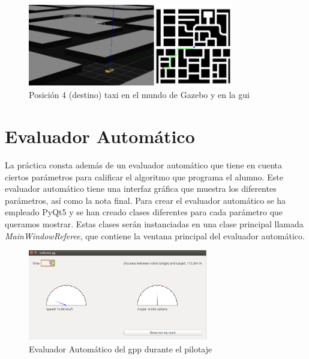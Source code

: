 \begin{figure}[H]
  \begin{center}
    \includegraphics[width=0.8\textwidth]{figures/GPP/camino1_G.png}
		\caption{Posición 4 (destino) taxi en el mundo de Gazebo y en la \acrshort{gui}}
		\label{fig.camino4_G_gpp}
		\end{center}
\end{figure}

\section{Evaluador Automático}
La práctica consta además de un evaluador automático que tiene en cuenta ciertos parámetros para calificar el algoritmo que programa el alumno. Este evaluador automático tiene una interfaz gráfica que muestra los diferentes parámetros, así como la nota final. Para crear el evaluador automático se ha empleado PyQt5 y se han creado clases diferentes para cada parámetro que queramos mostrar. Estas clases serán instanciadas en una clase principal llamada \textit{MainWindowReferee}, que contiene la ventana principal del evaluador automático.\\

\begin{figure}[H]
  \begin{center}
    \includegraphics[width=0.7\textwidth]{figures/GPP/referee2_gpp.png}
		\caption{Evaluador Automático del \acrshort{gpp} durante el pilotaje}
		\label{fig.referee2_gpp}
		\end{center}
\end{figure}

